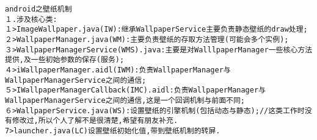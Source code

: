 \documentclass[a4paper,11pt,twoside,openany]{article}%
\begin{document}
\begin{CJK}{UTF8}{song}
\begin{comment}
{}表 示必须参数，[]表示可选参数。
/usr/share/texmf/tex/generic/tex4ht/listings.4ht
/usr/share/texmf-texlive/scripts/listings-ext
/usr/share/texmf-texlive/scripts/listings-ext/listings-ext.sh
/usr/share/texmf-texlive/tex/xelatex/bidi/listings-bidi.def
/usr/share/texmf-texlive/tex/xelatex/xepersian/listings-xepersian.def
/usr/share/texmf-texlive/tex/latex/koma-script/listings.hak
/usr/share/texmf-texlive/tex/latex/listings-ext
/usr/share/texmf-texlive/tex/latex/listings-ext/listings-ext.sty
/usr/share/texmf-texlive/tex/latex/oberdiek/listingsutf8.sty
/usr/share/texmf-texlive/tex/latex/listings
/usr/share/texmf-texlive/tex/latex/listings/listings.sty
/usr/share/texmf-texlive/tex/latex/listings/listings.cfg
/usr/share/doc/texlive-latex-recommended-doc/latex/listings/listings.pdf
/usr/share/doc/texlive-doc/latex/listings/listings.pdf
\end{comment}
% 
\begin{verbatim}
android之壁纸机制 
１.涉及核心类: 
１>ImageWallpaper.java(IW):继承WallpaperService主要负责静态壁纸的draw处理; 
２>WallpaperManager.java(WM):主要负责壁纸的存取方法管理(可能会多个实例); 
３>WallpaperManagerService(WMS).java:主要是对WalllpaperManager一些核心方法提供,及一些初始参数的保存(服务); 
４>iWallpaperManager.aidl(IWM):负责WallpaperManager与WallpaperManagerService之间的通信; 
５>IWallpaperManagerCallback(IMC).aidl:负责WallpaperManager与WallpaperManagerService之间的通信,这是一个回调机制与前面不同; 
６>WallpaperService.java(WS):设置壁纸的引擎机制(包括动态与静态);//这类工作时没有修改过,所以个人了解不是很清楚,希望有朋友补充. 
7>launcher.java(LC)设置壁纸初始化值,带到壁纸机制的转屏. 


\end{verbatim}
\end{CJK}
\end{document}
